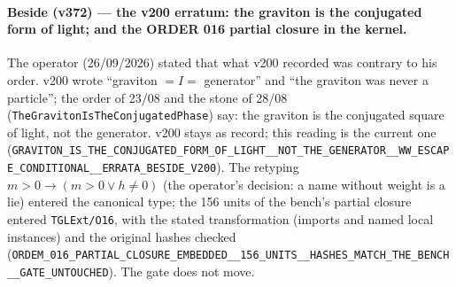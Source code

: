 \documentclass[11pt]{article}
\theoremstyle{definition}\newtheorem{deriv}{Derivation}
\begin{document}
\paragraph*{Beside (v372) --- the v200 erratum: the graviton is the conjugated form of light; and the ORDER 016 partial closure in the kernel.} The operator (26/09/2026) stated that what v200 recorded was contrary to his order. v200 wrote ``graviton $=I=$ generator'' and ``the graviton was never a particle''; the order of 23/08 and the stone of 28/08 (\texttt{TheGravitonIsTheConjugatedPhase}) say: the graviton is the conjugated square of light, not the generator. v200 stays as record; this reading is the current one (\texttt{GRAVITON\_IS\_THE\_CONJUGATED\_FORM\_OF\_LIGHT\_\_NOT\_THE\_GENERATOR\_\_WW\_ESCAPE\_CONDITIONAL\_\_ERRATA\_BESIDE\_V200}). The retyping $m>0\to(m>0\vee h\neq0)$ (the operator's decision: a name without weight is a lie) entered the canonical type; the 156 units of the bench's partial closure entered \texttt{TGLExt/O16}, with the stated transformation (imports and named local instances) and the original hashes checked (\texttt{ORDEM\_016\_PARTIAL\_CLOSURE\_EMBEDDED\_\_156\_UNITS\_\_HASHES\_MATCH\_THE\_BENCH\_\_GATE\_UNTOUCHED}). The gate does not move.
\end{document}
